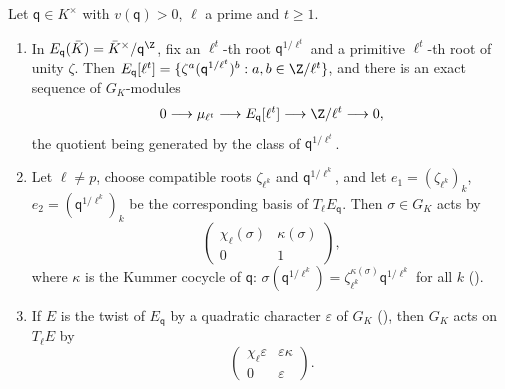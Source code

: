 \begin{proposition}\label{prop:reduction:tate-torsion}
Let $\mathsf q\in K^\times$ with $v(\mathsf q)>0$, $\ell$ a prime and $t\ge1$.
\begin{enumerate}[label=(\roman*)]
\item In $E_{\mathsf q}(\bar K)=\bar K^\times/\mathsf q^{\Z}$, fix an $\ell^t$-th root $\mathsf q^{1/\ell^t}$ and a primitive $\ell^t$-th root of unity
$\zeta$. Then $E_{\mathsf q}[\ell^t]=\{\zeta^a(\mathsf q^{1/\ell^t})^b:a,b\in\Z/\ell^t\}$, and there is an exact sequence of $G_K$-modules
\[
0\longrightarrow\mu_{\ell^t}\longrightarrow E_{\mathsf q}[\ell^t]\longrightarrow\Z/\ell^t\longrightarrow0,
\]
the quotient being generated by the class of $\mathsf q^{1/\ell^t}$.
\item Let $\ell\ne p$, choose compatible roots $\zeta_{\ell^k}$ and $\mathsf q^{1/\ell^k}$, and let $e_1=(\zeta_{\ell^k})_k$, $e_2=(\mathsf q^{1/\ell^k})_k$ be the
corresponding basis of $T_\ell E_{\mathsf q}$. Then $\sigma\in G_K$ acts by
\[
\begin{pmatrix}\chi_\ell(\sigma)&\kappa(\sigma)\\0&1\end{pmatrix},
\]
where $\kappa$ is the Kummer cocycle of $\mathsf q$: $\sigma(\mathsf q^{1/\ell^k})=\zeta_{\ell^k}^{\kappa(\sigma)}\mathsf q^{1/\ell^k}$ for all $k$ ().
\item If $E$ is the twist of $E_{\mathsf q}$ by a quadratic character $\varepsilon$ of $G_K$ (), then $G_K$
acts on $T_\ell E$ by
\[
\begin{pmatrix}\chi_\ell\varepsilon&\varepsilon\kappa\\0&\varepsilon\end{pmatrix}.
\]
\end{enumerate}
\end{proposition}

